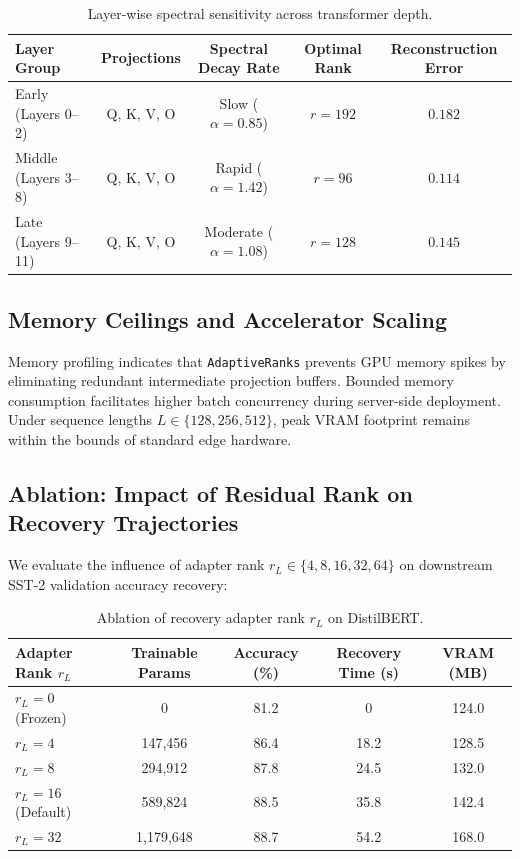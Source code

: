\begin{table}[H]
\centering
\small
\begin{tabular}{lcccc}
\toprule
\textbf{Layer Group} & \textbf{Projections} & \textbf{Spectral Decay Rate} & \textbf{Optimal Rank} & \textbf{Reconstruction Error} \\
\midrule
Early (Layers 0--2) & Q, K, V, O & Slow ($\alpha = 0.85$) & $r=192$ & $0.182$ \\
Middle (Layers 3--8) & Q, K, V, O & Rapid ($\alpha = 1.42$) & $r=96$ & $0.114$ \\
Late (Layers 9--11) & Q, K, V, O & Moderate ($\alpha = 1.08$) & $r=128$ & $0.145$ \\
\bottomrule
\end{tabular}
\caption{Layer-wise spectral sensitivity across transformer depth.}
\label{tab:layer_sensitivity}
\end{table}

\subsection{Memory Ceilings and Accelerator Scaling}
Memory profiling indicates that \texttt{AdaptiveRanks} prevents GPU memory spikes by eliminating redundant intermediate projection buffers. Bounded memory consumption facilitates higher batch concurrency during server-side deployment. Under sequence lengths $L \in \{128, 256, 512\}$, peak VRAM footprint remains within the bounds of standard edge hardware.

\subsection{Ablation: Impact of Residual Rank on Recovery Trajectories}
We evaluate the influence of adapter rank $r_L \in \{4, 8, 16, 32, 64\}$ on downstream SST-2 validation accuracy recovery:
\begin{table}[H]
\centering
\small
\begin{tabular}{lcccc}
\toprule
\textbf{Adapter Rank $r_L$} & \textbf{Trainable Params} & \textbf{Accuracy (\%)} & \textbf{Recovery Time (s)} & \textbf{VRAM (MB)} \\
\midrule
$r_L = 0$ (Frozen) & 0 & 81.2 & 0 & 124.0 \\
$r_L = 4$ & 147,456 & 86.4 & 18.2 & 128.5 \\
$r_L = 8$ & 294,912 & 87.8 & 24.5 & 132.0 \\
$r_L = 16$ (Default) & 589,824 & 88.5 & 35.8 & 142.4 \\
$r_L = 32$ & 1,179,648 & 88.7 & 54.2 & 168.0 \\
\bottomrule
\end{tabular}
\caption{Ablation of recovery adapter rank $r_L$ on DistilBERT.}
\label{tab:ablation_adapter_rank}
\end{table}

